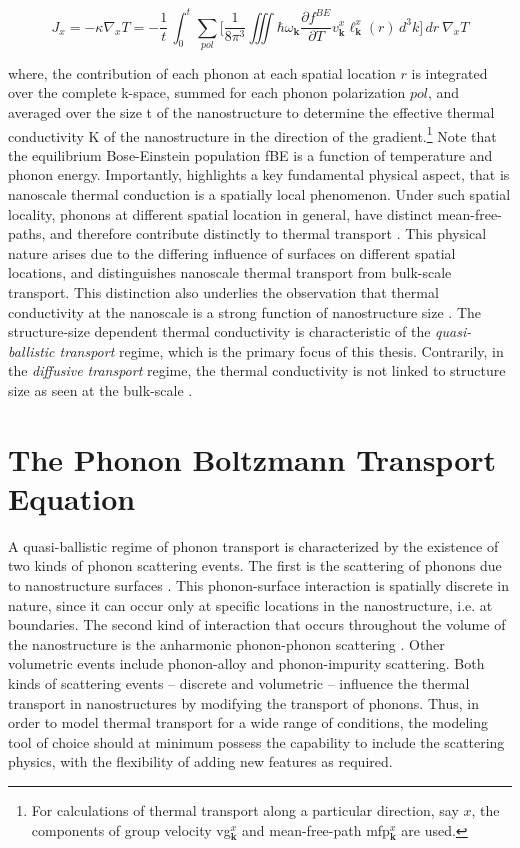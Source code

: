 \begin{equation}
{J_x}=-\kappa \nabla_x T = -\frac{1}{t}\,{\int_{0}^{t} \sum_{pol} \Big[ \frac{1}{8 \pi^3}\iiint \hbar\omega_{\mathbf{k}}\dfrac{\partial f^{BE}}{\partial T}v^x_{\mathbf{k}}\ell^x_{\mathbf{k}}({r}) \,d^3{k} \Big]} \,d{r}\:\nabla_x T
\label{eq:phonon_fourier}
\end{equation} 

where, the contribution of each phonon at each spatial location $r$ is integrated over the complete \gls{k}-space, summed for each phonon polarization $pol$, and averaged over the size \gls{t} of the nanostructure to determine the effective thermal conductivity \gls{K} of the nanostructure in the direction of the gradient.\footnote{For calculations of thermal transport along a particular direction, say $x$, the components of group velocity \gls{vg}$^x_\mathbf{k}$ and mean-free-path \gls{mfp}$^x_\mathbf{k}$ are used.} Note that the equilibrium Bose-Einstein population \gls{fBE} is a function of temperature and phonon energy. Importantly,  highlights a key fundamental physical aspect, that is nanoscale thermal conduction is a spatially local phenomenon. Under such spatial locality, phonons at different spatial location in general, have distinct mean-free-paths, and therefore contribute distinctly to thermal transport \cite{maldovan2011tf,ownSpatialTF}. This physical nature arises due to the differing influence of surfaces on different spatial  locations, and distinguishes nanoscale thermal transport from bulk-scale transport. This distinction also underlies the observation that thermal conductivity at the nanoscale is a strong function of nanostructure size \cite{book_Ziman,ownNW,ownTF}. The structure-size dependent thermal conductivity is characteristic of the \emph{quasi-ballistic transport} regime, which is the primary focus of this thesis. Contrarily, in the \emph{diffusive transport} regime, the thermal conductivity is not linked to structure size as seen at the bulk-scale \cite{book_Bird}.
 
\section{The Phonon Boltzmann Transport Equation}
A quasi-ballistic regime of phonon transport is characterized by the existence of two kinds of phonon scattering events. The first is the scattering of phonons due to nanostructure surfaces \cite{book_Ziman}. This phonon-surface interaction is spatially discrete in nature, since it can occur only at specific locations in the nanostructure, i.e. at boundaries. The second kind of interaction that occurs throughout the volume of the nanostructure is the anharmonic phonon-phonon scattering \cite{book_Ashcroft}. Other volumetric events include phonon-alloy and phonon-impurity scattering. Both kinds of scattering events -- discrete and volumetric -- influence the thermal transport in nanostructures by modifying the transport of phonons.  Thus, in order to model thermal transport for a wide range of conditions, the modeling tool of choice should at minimum possess the capability to include the scattering physics, with the flexibility of adding new features as required.

